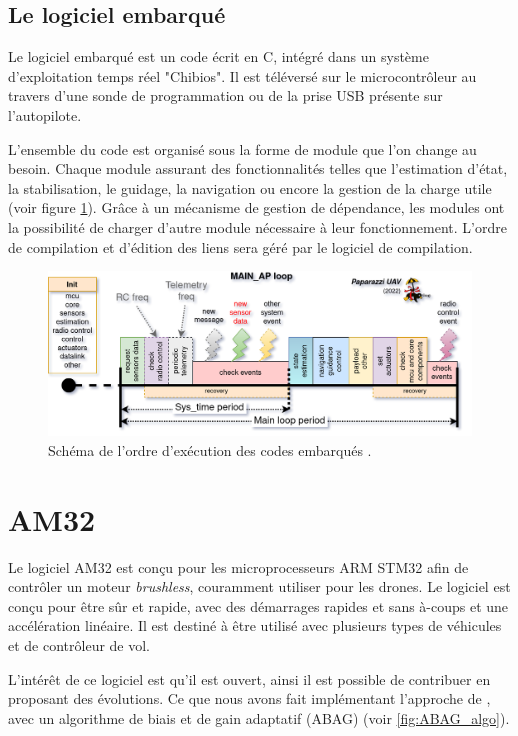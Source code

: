 { \subsection{Le logiciel embarqué}
 Le logiciel embarqué est un code écrit en C, intégré dans un système d'exploitation temps réel "Chibios". Il est téléversé sur le microcontrôleur au travers d'une sonde de programmation ou de la prise USB présente sur l'autopilote.

 L'ensemble du code est organisé sous la forme de module que l'on change au besoin. Chaque module assurant des fonctionnalités telles que l'estimation d'état, la stabilisation, le guidage, la navigation ou encore la gestion de la charge utile (voir figure \ref{fig:schedulingpaparazzi}). Grâce à un mécanisme de gestion de dépendance, les modules ont la possibilité de charger d'autre module nécessaire à leur fonctionnement. L'ordre de compilation et d'édition des liens sera géré par le logiciel de compilation.


 \begin{figure}[ht!]
    \centerline{
    \includegraphics[trim=0cm 0cm 0cm 0cm,clip,width=0.7\columnwidth]{figures/PPRZ_Main_ap_loop.png}}
    \caption{Schéma de l'ordre d'exécution des codes embarqués \cite{RTDpaparazzi2022}.}
    \label{fig:schedulingpaparazzi}
\end{figure}

 
\section{AM32}
\label{sec:AM32}
Le logiciel AM32 est conçu pour les microprocesseurs ARM STM32 afin de contrôler un moteur \textit{brushless}, couramment utiliser pour les drones. Le logiciel est conçu pour être sûr et rapide, avec des démarrages rapides et sans à-coups et une accélération linéaire. Il est destiné à être utilisé avec plusieurs types de véhicules et de contrôleur de vol. 

L'intérêt de ce logiciel est qu'il est ouvert, ainsi il est possible de contribuer en proposant des évolutions. Ce que nous avons fait implémentant l'approche de \cite{franchi2017}, avec un algorithme de biais et de gain adaptatif (ABAG) (voir \ref{fig:ABAG_algo}).

}
